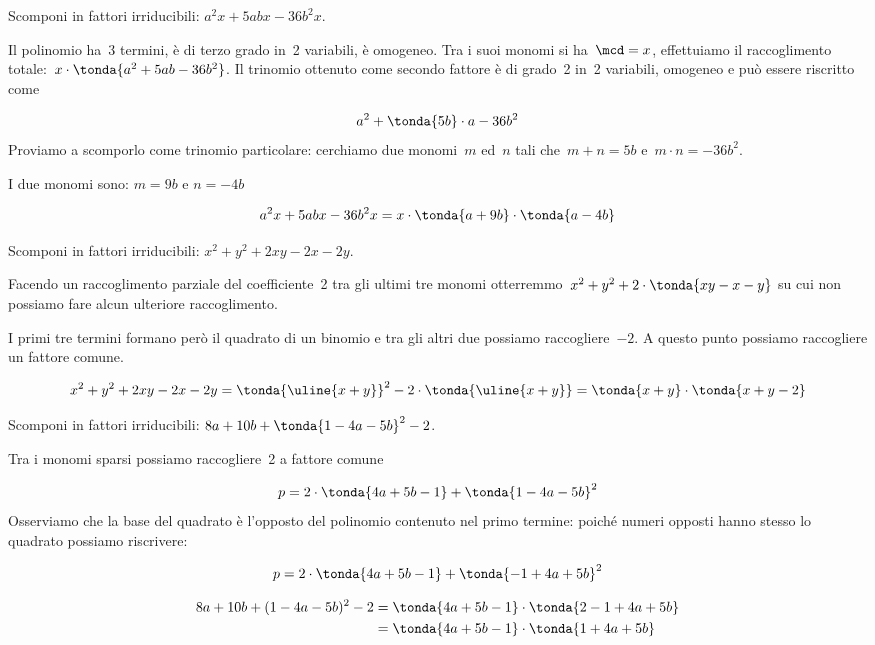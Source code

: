 \begin{esempio}{}{}
Scomponi in fattori irriducibili: \(a^{2}x+5abx-36b^{2}x\).

Il polinomio ha~3 termini, è di terzo grado in~2 variabili, è omogeneo.
Tra i suoi monomi si ha~\(\mcd= x\), effettuiamo il raccoglimento
totale:~\(x\cdot\tonda{a^{2}+5ab-36b^{2}}\).
Il trinomio ottenuto come secondo fattore è di grado~2 in~2 variabili,
omogeneo e può essere riscritto come 

\vspace{-1em}
\[a^{2} +\tonda{5b}\cdot a -36b^{2}\]
Proviamo a scomporlo come trinomio particolare:
cerchiamo due monomi~\(m\) ed~\(n\) tali che~\(m+n=5b\)
e~\(m\cdot n=-36b^{2}\). 

I due monomi sono: \quad \(m = 9b\) \quad e \quad \(n = -4b\)

\vspace{-1em}
\[a^{2}x +5abx-36b^{2}x = x\cdot\tonda{a +9b}\cdot \tonda{a -4b}\]
\end{esempio}

\begin{esempio}{}{}
Scomponi in fattori irriducibili: \(x^2+y^{2}+2xy-2x-2y\).

Facendo un raccoglimento parziale del coefficiente~2 tra gli ultimi tre 
monomi otterremmo~\(x^2+y^{2}+2\cdot\tonda{xy-x-y}\) su cui non possiamo
fare alcun ulteriore raccoglimento.

I primi tre termini formano però il quadrato di un binomio e tra gli
altri due possiamo raccogliere~\(-2\). 
A questo punto possiamo raccogliere un fattore comune.

\vspace{-1em}
\begin{equation*}
x^2 +y^{2} +2xy -2x -2y =
\tonda{\uline{{x+y}}}^{2}-2\cdot\tonda{\uline{{x+y}}} =
\tonda{x+y}\cdot \tonda{x+y-2}
\end{equation*}
\end{esempio}

\begin{esempio}{}{}
Scomponi in fattori irriducibili: \(8a+10b+\tonda{1-4a-5b}^{2}-2\).

Tra i monomi sparsi possiamo raccogliere~2 a fattore comune

\vspace{-1em}
\[p=2\cdot \tonda{4a+5b-1}+\tonda{1-4a-5b}^{2}\]
Osserviamo che la base del quadrato è l'opposto del polinomio contenuto
nel primo termine: poiché numeri opposti hanno
stesso lo quadrato possiamo riscrivere:

\vspace{-1em}
\[p=2\cdot\tonda{4a+5b-1}+\tonda{-1+4a+5b}^{2}\]

\vspace{-2em}
\begin{align*}
8a+10b+(1-4a-5b)^{2}-2&=\tonda{4a+5b-1}\cdot\tonda{2-1+4a+5b}\\
&=\tonda{4a+5b-1}\cdot\tonda{1+4a+5b}
\end{align*}
\end{esempio}

